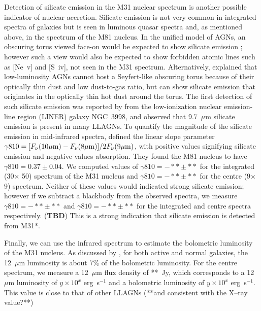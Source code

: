 Detection of silicate emission in the M31 nuclear spectrum is another possible indicator of nuclear accretion.
Silicate emission is not very common in integrated spectra of galaxies \citep{Spoon2007} but is seen in luminous 
quasar spectra \citep{Hill14} and, as mentioned above, in the spectrum of the M81 nucleus. 
In the unified model of AGNs, an obscuring torus viewed face-on would be expected to show silicate emission
\citep{AGNtypes1995, AGNref}; however such a view would also be expected to show forbidden atomic lines such as [Ne~{\sc v}] and [S~{\sc iv}],
not seen in the M31 spectrum. Alternatively, \citet{Mason2012} explained that low-luminosity AGNs cannot 
host a Seyfert-like obscuring torus because of their optically thin dust and low dust-to-gas ratio, but can show
silicate emission that originates in the optically thin hot dust around the torus.  The first detection of such silicate emission was 
reported by \citet{Sturm2005} from the low-ionization nuclear emission-line region (LINER) galaxy NGC~3998, and 
\citealt{Mason2012}  observed that  9.7~$\mu$m silicate emission is present in many LLAGNs. 
To quantify the magnitude of the silicate emission in mid-infrared spectra, \citet{Smith2010} defined
the linear slope parameter $\gamma810 =[F_{\nu}(10\mu{\rm m}) -F_{\nu}(8\mu{\rm m})]/2F_{\nu}(9\mu{\rm m})$,
with positive values signifying silicate emission and negative values absorption. They found the M81 nucleus to have
$\gamma810=0.37\pm0.04$. We computed values of $\gamma810 =-**\pm **$ for the integrated (30\arcsec $\times$ 50\arcsec)
spectrum of the M31 nucleus and $\gamma810 =-**\pm **$ for the centre (9\arcsec $\times$ 9\arcsec) spectrum.
Neither of these values would indicated strong silicate emission; however if we subtract a
blackbody from the observed spectra, we measure  $\gamma810 =-**\pm **$ and  $\gamma810 =-**\pm **$ for
the integrated and centre spectra respectively. ({\bf TBD}) This is a strong indication that silicate emission is detected
from M31*.

Finally, we can use the infrared spectrum to estimate the bolometric luminosity  of the M31 nucleus.
As discussed by \citet{spinoglio95}, for both active and normal galaxies, the 12~$\mu$m luminosity 
is about 7\% of the bolometric luminosity. For the centre spectrum, we measure a 12~$\mu$m flux density of 
**~Jy, which corresponds to a 12~$\mu$m luminosity of $y \times10^{x}$ erg~s$^{-1}$ and a bolometric luminosity
of  $y \times10^{x}$ erg~s$^{-1}$.  This value is close to that of other LLAGNs (**and consistent with the X--ray value?**)
